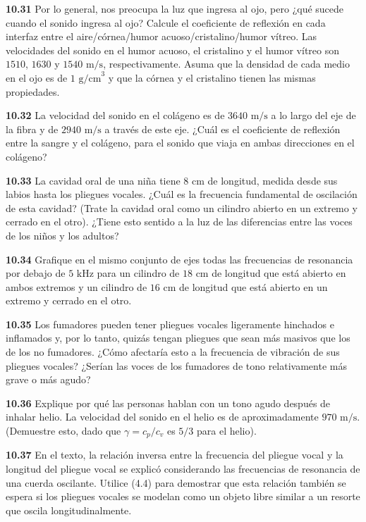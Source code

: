 \documentclass[12pt]{book}
\begin{document}
\noindent \textbf{10.31} Por lo general, nos preocupa la luz que ingresa al ojo, pero ¿qué sucede cuando el sonido ingresa al ojo? Calcule el coeficiente de reflexión en cada interfaz entre el aire/córnea/humor acuoso/cristalino/humor vítreo. Las velocidades del sonido en el humor acuoso, el cristalino y el humor vítreo son $1510$, $1630$ y $1540\text{ m/s}$, respectivamente. Asuma que la densidad de cada medio en el ojo es de $1\text{ g/cm}^3$ y que la córnea y el cristalino tienen las mismas propiedades.

\noindent \textbf{10.32} La velocidad del sonido en el colágeno es de $3640\text{ m/s}$ a lo largo del eje de la fibra y de $2940\text{ m/s}$ a través de este eje. ¿Cuál es el coeficiente de reflexión entre la sangre y el colágeno, para el sonido que viaja en ambas direcciones en el colágeno?

\noindent \textbf{10.33} La cavidad oral de una niña tiene $8\text{ cm}$ de longitud, medida desde sus labios hasta los pliegues vocales. ¿Cuál es la frecuencia fundamental de oscilación de esta cavidad? (Trate la cavidad oral como un cilindro abierto en un extremo y cerrado en el otro). ¿Tiene esto sentido a la luz de las diferencias entre las voces de los niños y los adultos?

\noindent \textbf{10.34} Grafique en el mismo conjunto de ejes todas las frecuencias de resonancia por debajo de $5\text{ kHz}$ para un cilindro de $18\text{ cm}$ de longitud que está abierto en ambos extremos y un cilindro de $16\text{ cm}$ de longitud que está abierto en un extremo y cerrado en el otro.

\noindent \textbf{10.35} Los fumadores pueden tener pliegues vocales ligeramente hinchados e inflamados y, por lo tanto, quizás tengan pliegues que sean más masivos que los de los no fumadores. ¿Cómo afectaría esto a la frecuencia de vibración de sus pliegues vocales? ¿Serían las voces de los fumadores de tono relativamente más grave o más agudo?

\noindent \textbf{10.36} Explique por qué las personas hablan con un tono agudo después de inhalar helio. La velocidad del sonido en el helio es de aproximadamente $970\text{ m/s}$. (Demuestre esto, dado que $\gamma = c_p/c_v$ es $5/3$ para el helio).

\noindent \textbf{10.37} En el texto, la relación inversa entre la frecuencia del pliegue vocal y la longitud del pliegue vocal se explicó considerando las frecuencias de resonancia de una cuerda oscilante. Utilice (4.4) para demostrar que esta relación también se espera si los pliegues vocales se modelan como un objeto libre similar a un resorte que oscila longitudinalmente.
\end{document}
